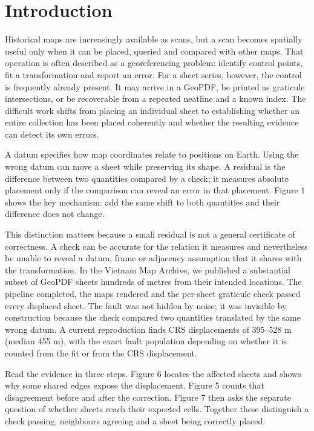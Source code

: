 \documentclass[11pt,a4paper]{article}
\begin{document}
\section{Introduction}

Historical maps are increasingly available as scans, but a scan becomes spatially useful only when it can be placed, queried and compared with other maps. That operation is often described as a georeferencing problem: identify control points, fit a transformation and report an error. For a sheet series, however, the control is frequently already present. It may arrive in a GeoPDF, be printed as graticule intersections, or be recoverable from a repeated neatline and a known index. The difficult work shifts from placing an individual sheet to establishing whether an entire collection has been placed coherently and whether the resulting evidence can detect its own errors.

A datum specifies how map coordinates relate to positions on Earth. Using the wrong datum can move a sheet while preserving its shape. A residual is the difference between two quantities compared by a check; it measures absolute placement only if the comparison can reveal an error in that placement. Figure 1 shows the key mechanism: add the same shift to both quantities and their difference does not change.

This distinction matters because a small residual is not a general certificate of correctness. A check can be accurate for the relation it measures and nevertheless be unable to reveal a datum, frame or adjacency assumption that it shares with the transformation. In the Vietnam Map Archive, we published a substantial subset of GeoPDF sheets hundreds of metres from their intended locations. The pipeline completed, the maps rendered and the per-sheet graticule check passed every displaced sheet. The fault was not hidden by noise; it was invisible by construction because the check compared two quantities translated by the same wrong datum. A current reproduction finds CRS displacements of 395–528 m (median 455 m), with the exact fault population depending on whether it is counted from the fit or from the CRS displacement.

Read the evidence in three steps. Figure 6 locates the affected sheets and shows why some shared edges expose the displacement. Figure 5 counts that disagreement before and after the correction. Figure 7 then asks the separate question of whether sheets reach their expected cells. Together these distinguish a check passing, neighbours agreeing and a sheet being correctly placed.
\end{document}
